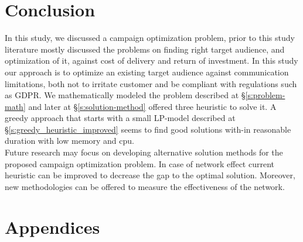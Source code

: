 \documentclass[11pt]{article}
\begin{document}
\section{Conclusion} \label{s:conclusion}
In this study, we discussed a campaign optimization problem, prior to this study literature mostly discussed the problems on finding right target audience, and optimization of it, against cost of delivery and return of investment. In this study our approach is to optimize an existing target audience against communication limitations, both not to irritate customer and be compliant with regulations such as GDPR. We mathematically modeled the problem described at \S \ref{s:problem-math} and later at \S \ref{s:solution-method} offered three heuristic to solve it. A greedy approach that starts with a small LP-model described at \S \ref{s:greedy_heuristic_improved} seems to find good solutions with-in reasonable duration with low memory and cpu.\\
Future research may focus on developing alternative solution methods for the proposed campaign optimization problem. In case of network effect current heuristic can be improved to decrease the gap to the optimal solution. Moreover, new methodologies can be offered to measure the effectiveness of the network.

\newpage

\appendix
\section{Appendices}
\end{document}
